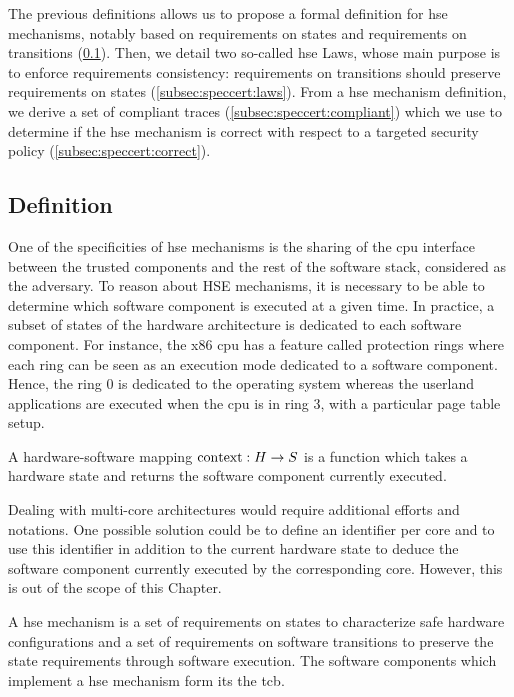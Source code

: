 The previous definitions allows us to propose a formal definition for \ac{hse}
mechanisms, notably based on requirements on states and requirements on
transitions (\ref{subsec:speccert:hsedef}).
%
Then, we detail two so-called \ac{hse} Laws, whose main purpose is to enforce
requirements consistency: requirements on transitions should preserve
requirements on states (\ref{subsec:speccert:laws}).
%
From a \ac{hse} mechanism definition, we derive a set of compliant traces
(\ref{subsec:speccert:compliant}) which we use to determine if the \ac{hse}
mechanism is correct with respect to a targeted security policy
(\ref{subsec:speccert:correct}).

\subsection{Definition}
\label{subsec:speccert:hsedef}

One of the specificities of \ac{hse} mechanisms is the sharing of the \ac{cpu}
interface between the trusted components and the rest of the software stack,
considered as the adversary.
%
To reason about HSE mechanisms, it is necessary to be able to determine which
software component is executed at a given time.
%
In practice, a subset of states of the hardware architecture is dedicated to
each software component.
%
For instance, the x86 \ac{cpu} has a feature called protection rings where each
ring can be seen as an execution mode dedicated to a software component.
%
Hence, the ring 0 is dedicated to the operating system whereas the userland
applications are executed when the \ac{cpu} is in ring 3, with a particular page
table setup.

\begin{definition}
  \label{def:hardsoftmap}
  A hardware-software mapping $\mathrm{con\-text} : H \rightarrow S$ is a function
  which takes a hardware state and returns the software component currently
  executed.
\end{definition}

Dealing with multi-core architectures would require additional efforts and
notations.
%
One possible solution could be to define an identifier per core and to use this
identifier in addition to the current hardware state to deduce the software
component currently executed by the corresponding core.
%
However, this is out of the scope of this Chapter.

A \ac{hse} mechanism is a set of requirements on states to characterize safe
hardware configurations and a set of requirements on software transitions to
preserve the state requirements through software execution.
%
The software components which implement a \ac{hse} mechanism form its the
\ac{tcb}.

